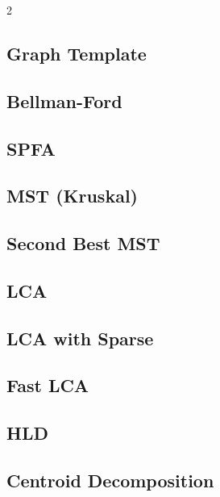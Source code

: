 \documentclass[10pt,a4paper]{extarticle}
\begin{document}
\begin{landscape}
\begin{multicols}{2}
\subsection{Graph Template}


\subsection{Bellman-Ford}


\subsection{SPFA}


\subsection{MST (Kruskal)}


\subsection{Second Best MST}


\subsection{LCA}


\subsection{LCA with Sparse}


\subsection{Fast LCA}


\subsection{HLD}


\subsection{Centroid Decomposition}



\end{multicols}
\end{landscape}
\end{document}
